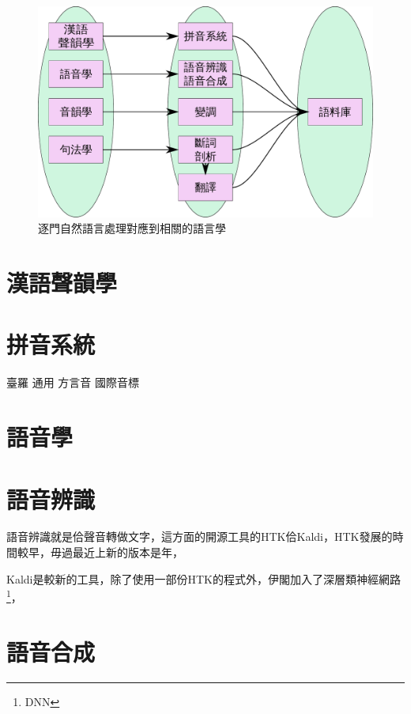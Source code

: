 \documentclass[final,oneside,onecolumn,12pt,a4paper]{book}%
\begin{document}
\begin{figure}
\centerline{\includegraphics[keepaspectratio,width=40em]{圖/相關研究智識}}
\caption{逐門自然語言處理對應到相關的語言學}
\label{圖：相關研究智識}
\end{figure}

\section{漢語聲韻學}
\label{節：漢語聲韻學}


\section{拼音系統}
\label{節：拼音系統}
	臺羅
	通用
	方言音
	國際音標
	
\section{語音學}
\label{節：語音學}

\section{語音辨識}
\label{節：語音辨識}
語音辨識就是佮聲音轉做文字，這方面的開源工具的HTK佮Kaldi，HTK發展的時間較早，毋過最近上新的版本是年，

Kaldi是較新的工具，除了使用一部份HTK的程式外，伊閣加入了深層類神經網路\footnote{DNN}，


\section{語音合成}
\label{節：語音合成}
\end{document}
